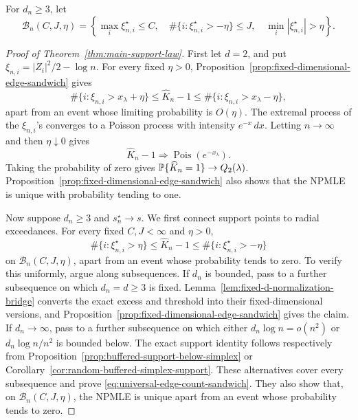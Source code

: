 For \(d_n\ge3\), let
\begin{equation}
\label{eq:exact-support-buffer}
 \mathcal B_n(C,J,\eta)
 =
 \left\{
 \max_i\xi_{n,i}^\star\le C,\quad
 \#\{i:\xi_{n,i}^\star>-\eta\}\le J,\quad
 \min_i|\xi_{n,i}^\star|>\eta
 \right\}.
\end{equation}
\begin{proof}[Proof of Theorem~\ref{thm:main-support-law}]
First let \(d=2\), and put
\(\xi_{n,i}=|Z_i|^2/2-\log n\). For every fixed \(\eta>0\),
Proposition~\ref{prop:fixed-dimensional-edge-sandwich} gives
\[
 \#\{i:\xi_{n,i}>x_\lambda+\eta\}
 \le \widehat K_n-1
 \le \#\{i:\xi_{n,i}>x_\lambda-\eta\},
\]
apart from an event whose limiting probability is \(O(\eta)\). The extremal
process of the \(\xi_{n,i}\)'s converges to a Poisson process with intensity
\(e^{-x}\,dx\). Letting \(n\to\infty\) and then \(\eta\downarrow0\) gives
\[
 \widehat K_n-1\Rightarrow\operatorname{Pois}(e^{-x_\lambda}).
\]
Taking the probability of zero gives
\(\mathbb P\{\widehat K_n=1\}\to Q_2(\lambda)\).
Proposition~\ref{prop:fixed-dimensional-edge-sandwich} also shows that the
NPMLE is unique with probability tending to one.

Now suppose \(d_n\ge3\) and \(s_n^\star\to s\). We first connect support
points to radial exceedances. For every fixed \(C,J<\infty\) and \(\eta>0\),
\begin{equation}
\label{eq:universal-edge-count-sandwich}
 \#\{i:\xi_{n,i}^\star>\eta\}
 \le \widehat K_n-1
 \le \#\{i:\xi_{n,i}^\star>-\eta\}
\end{equation}
on \(\mathcal B_n(C,J,\eta)\), apart from an event whose probability tends to
zero. To verify this uniformly, argue along subsequences. If \(d_n\) is
bounded, pass to a further subsequence on which \(d_n=d\ge3\) is fixed.
Lemma~\ref{lem:fixed-d-normalization-bridge} converts the exact excess and
threshold into their fixed-dimensional versions, and
Proposition~\ref{prop:fixed-dimensional-edge-sandwich} gives the claim. If
\(d_n\to\infty\), pass to a further subsequence on which either
\(d_n\log n=o(n^2)\) or \(d_n\log n/n^2\) is bounded below. The exact support
identity follows respectively from
Proposition~\ref{prop:buffered-support-below-simplex} or
Corollary~\ref{cor:random-buffered-simplex-support}. These alternatives cover
every subsequence and prove \eqref{eq:universal-edge-count-sandwich}.  They
also show that, on \(\mathcal B_n(C,J,\eta)\), the NPMLE is unique apart from
an event whose probability tends to zero.


\end{proof}
